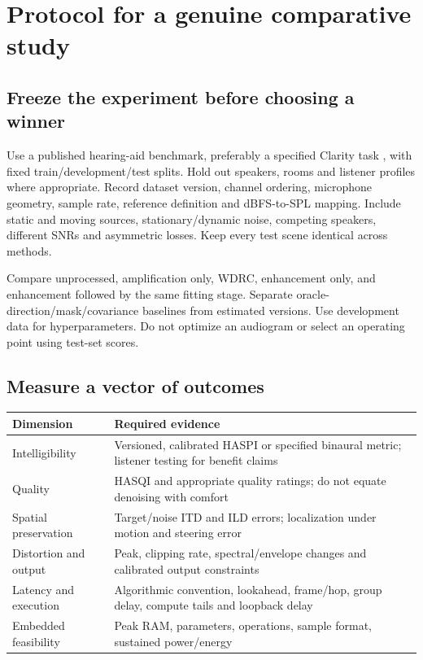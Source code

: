 \documentclass[11pt,a4paper]{article}
\begin{document}
\section{Protocol for a genuine comparative study}
\subsection{Freeze the experiment before choosing a winner}
Use a published hearing-aid benchmark, preferably a specified Clarity task \cite{clarity}, with fixed train/development/test splits. Hold out speakers, rooms and listener profiles where appropriate. Record dataset version, channel ordering, microphone geometry, sample rate, reference definition and dBFS-to-SPL mapping. Include static and moving sources, stationary/dynamic noise, competing speakers, different SNRs and asymmetric losses. Keep every test scene identical across methods.

Compare unprocessed, amplification only, WDRC, enhancement only, and enhancement followed by the same fitting stage. Separate oracle-direction/mask/covariance baselines from estimated versions. Use development data for hyperparameters. Do not optimize an audiogram or select an operating point using test-set scores.

\subsection{Measure a vector of outcomes}
\begin{tabularx}{\linewidth}{@{}p{.24\linewidth}Y@{}}\toprule
Dimension & Required evidence\\\midrule
Intelligibility & Versioned, calibrated HASPI or specified binaural metric; listener testing for benefit claims\\
Quality & HASQI and appropriate quality ratings; do not equate denoising with comfort\\
Spatial preservation & Target/noise ITD and ILD errors; localization under motion and steering error\\
Distortion and output & Peak, clipping rate, spectral/envelope changes and calibrated output constraints\\
Latency and execution & Algorithmic convention, lookahead, frame/hop, group delay, compute tails and loopback delay\\
Embedded feasibility & Peak RAM, parameters, operations, sample format, sustained power/energy\\\bottomrule
\end{tabularx}
\end{document}
